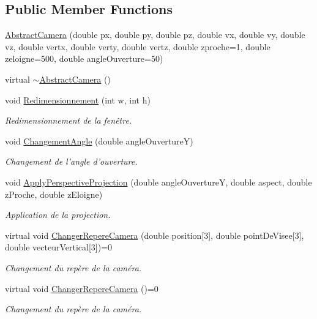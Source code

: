 \subsection*{Public Member Functions}
\begin{DoxyCompactItemize}
\item 
\hyperlink{class_abstract_camera_a66df51ce45fb8be484c56161fe326129}{Abstract\+Camera} (double px, double py, double pz, double vx, double vy, double vz, double vertx, double verty, double vertz, double zproche=1, double zeloigne=500, double angle\+Ouverture=50)
\item 
virtual \hyperlink{class_abstract_camera_addf550f9f41d04bd6651b19d795bdabe}{$\sim$\+Abstract\+Camera} ()
\item 
void \hyperlink{class_abstract_camera_a7231574aecbb95374f3b6f82349608a4}{Redimensionnement} (int w, int h)
\begin{DoxyCompactList}\small\item\em Redimensionnement de la fenêtre. \end{DoxyCompactList}\item 
void \hyperlink{class_abstract_camera_a14ae54182b566740e1285ad33dfc6b2b}{Changement\+Angle} (double angle\+Ouverture\+Y)
\begin{DoxyCompactList}\small\item\em Changement de l'angle d'ouverture. \end{DoxyCompactList}\item 
void \hyperlink{class_abstract_camera_a2685cf0a29e7dac3ca7c8b6d6b545810}{Apply\+Perspective\+Projection} (double angle\+Ouverture\+Y, double aspect, double z\+Proche, double z\+Eloigne)
\begin{DoxyCompactList}\small\item\em Application de la projection. \end{DoxyCompactList}\item 
virtual void \hyperlink{class_abstract_camera_aeaa6522c54a923a50137d2c0ca54238b}{Changer\+Repere\+Camera} (double position\mbox{[}3\mbox{]}, double point\+De\+Visee\mbox{[}3\mbox{]}, double vecteur\+Vertical\mbox{[}3\mbox{]})=0
\begin{DoxyCompactList}\small\item\em Changement du repère de la caméra. \end{DoxyCompactList}\item 
virtual void \hyperlink{class_abstract_camera_a4bfcc6ed8980d64cf1d43d7dcb60129b}{Changer\+Repere\+Camera} ()=0
\begin{DoxyCompactList}\small\item\em Changement du repère de la caméra. \end{DoxyCompactList}\item 

\end{DoxyCompactItemize}
